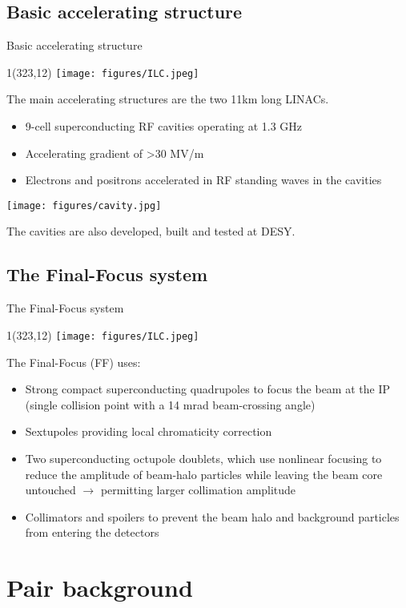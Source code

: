 \documentclass[xcolor={dvipsnames}]{beamer}
\newcommand{\ilclogo}{
  \setlength{\TPHorizModule}{1pt}
  \setlength{\TPVertModule}{1pt}
  \begin{textblock}{1}(323,12)
   \texttt{[image: figures/ILC.jpeg]}
  \end{textblock}
}
\begin{document}
\subsection{Basic accelerating structure}
\begin{frame}{Basic accelerating structure}
\ilclogo
The main accelerating structures are the two 11km long LINACs.
\begin{itemize}
\item 9-cell superconducting RF cavities operating at 1.3 GHz 
\item Accelerating gradient of >30 MV/m
\item Electrons and positrons accelerated in RF standing waves in the cavities 
\end{itemize}
\begin{center}
\texttt{[image: figures/cavity.jpg]}
\end{center}
The cavities are also developed, built and tested at DESY.
\end{frame}

\subsection{The Final-Focus system}
\begin{frame}{The Final-Focus system}
 \ilclogo
 The Final-Focus (FF) uses:
\begin{itemize}
 \item Strong compact superconducting quadrupoles to focus the
beam at the IP (single collision point with a 14 mrad beam-crossing angle)
\item Sextupoles providing local chromaticity correction
\item Two superconducting octupole doublets, which use nonlinear
focusing to reduce the amplitude of beam-halo particles while leaving the beam core untouched $\rightarrow$ permitting larger collimation amplitude
\item Collimators and spoilers to prevent the beam halo and background particles from entering the detectors
\end{itemize}
\end{frame}

\section{Pair background}
\end{document}
